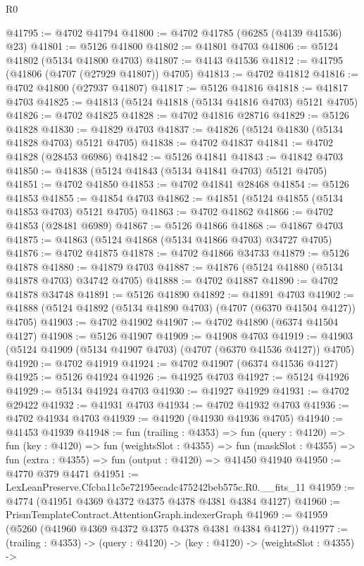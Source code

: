 \begin{lexlean}{R0}
\begin{coremodule}
@41795 := @4702 @41794
@41800 := @4702 @41785 (@6285 (@4139 @41536) @23)
@41801 := @5126 @41800
@41802 := @41801 @4703
@41806 := @5124 @41802 (@5134 @41800 @4703)
@41807 := @4143 @41536
@41812 := @41795 (@41806 (@4707 (@27929 @41807)) @4705)
@41813 := @4702 @41812
@41816 := @4702 @41800 (@27937 @41807)
@41817 := @5126 @41816
@41818 := @41817 @4703
@41825 := @41813 (@5124 @41818 (@5134 @41816 @4703) @5121 @4705)
@41826 := @4702 @41825
@41828 := @4702 @41816 @28716
@41829 := @5126 @41828
@41830 := @41829 @4703
@41837 := @41826 (@5124 @41830 (@5134 @41828 @4703) @5121 @4705)
@41838 := @4702 @41837
@41841 := @4702 @41828 (@28453 @6986)
@41842 := @5126 @41841
@41843 := @41842 @4703
@41850 := @41838 (@5124 @41843 (@5134 @41841 @4703) @5121 @4705)
@41851 := @4702 @41850
@41853 := @4702 @41841 @28468
@41854 := @5126 @41853
@41855 := @41854 @4703
@41862 := @41851 (@5124 @41855 (@5134 @41853 @4703) @5121 @4705)
@41863 := @4702 @41862
@41866 := @4702 @41853 (@28481 @6989)
@41867 := @5126 @41866
@41868 := @41867 @4703
@41875 := @41863 (@5124 @41868 (@5134 @41866 @4703) @34727 @4705)
@41876 := @4702 @41875
@41878 := @4702 @41866 @34733
@41879 := @5126 @41878
@41880 := @41879 @4703
@41887 := @41876 (@5124 @41880 (@5134 @41878 @4703) @34742 @4705)
@41888 := @4702 @41887
@41890 := @4702 @41878 @34748
@41891 := @5126 @41890
@41892 := @41891 @4703
@41902 := @41888 (@5124 @41892 (@5134 @41890 @4703) (@4707 (@6370 @41504 @4127)) @4705)
@41903 := @4702 @41902
@41907 := @4702 @41890 (@6374 @41504 @4127)
@41908 := @5126 @41907
@41909 := @41908 @4703
@41919 := @41903 (@5124 @41909 (@5134 @41907 @4703) (@4707 (@6370 @41536 @4127)) @4705)
@41920 := @4702 @41919
@41924 := @4702 @41907 (@6374 @41536 @4127)
@41925 := @5126 @41924
@41926 := @41925 @4703
@41927 := @5124 @41926
@41929 := @5134 @41924 @4703
@41930 := @41927 @41929
@41931 := @4702 @29422
@41932 := @41931 @4703
@41934 := @4702 @41932 @4703
@41936 := @4702 @41934 @4703
@41939 := @41920 (@41930 @41936 @4705)
@41940 := @41453 @41939
@41948 := fun (trailing : @4353) =>
  fun (query : @4120) =>
  fun (key : @4120) =>
  fun (weightsSlot : @4355) =>
  fun (maskSlot : @4355) => fun (extra : @4355) => fun (output : @4120) => @41450 @41940
@41950 := @4770 @379 @4471
@41951 := LexLeanPreserve.Cfcba11c5e72195ecadc475242beb575c.R0.__fits_11
@41959 := @4774 (@41951 @4369 @4372 @4375 @4378 @4381 @4384 @4127)
@41960 := PrismTemplateContract.AttentionGraph.indexerGraph
@41969 := @41959 (@5260 (@41960 @4369 @4372 @4375 @4378 @4381 @4384 @4127))
@41977 := (trailing : @4353) ->
  (query : @4120) ->
  (key : @4120) ->
  (weightsSlot : @4355) ->

\end{coremodule}
\end{lexlean}
